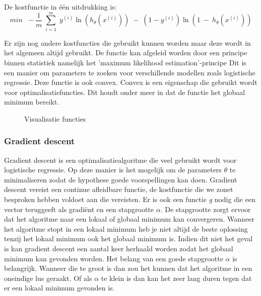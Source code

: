 De kostfunctie in één uitdrukking is: 
$$ 
min \;\; -\frac{1}{m}\;\sum_{i=1}^{m} \;  y^{(i)}\ln(h_{\theta}(x^{(i)})) \;- \;(1-y^{(i)}) \ln(1\:-\:h_{\theta}(x^{(i)}))  
$$

Er zijn nog andere kostfuncties die gebruikt kunnen worden maar deze wordt in het algemeen altijd gebruikt.
De functie kan afgeleid worden door een principe binnen statistiek namelijk het 'maximum likelihood estimation'-principe Dit is een manier om parameters te zoeken voor verschillende modellen zoals logistische regressie. Deze functie is ook convex. Convex is een eigenschap die gebruikt wordt voor optimalisatiefuncties. Dit houdt onder meer in dat de functie het globaal minimum bereikt. 

\begin{figure}
	\centering
	\caption{Visualisatie functies}
	\label{fig:kostfunctie}
\end{figure}

\subsubsection{Gradient descent}
\label{sec:gradient-descent}
Gradient descent is een optimalisatiealgoritme die veel gebruikt wordt voor logistische regressie. Op deze manier is het mogelijk om de parameters $\theta$ te minimaliseren zodat de hypothese goede voorspellingen kan doen.
Gradient descent vereist een continue afleidbare functie, de kostfunctie die we zonet besproken hebben voldoet aan die vereisten. Er is ook een functie \textit{g} nodig die een vector teruggeeft als gradiënt en een stapgrootte $\alpha$. De stapgrootte zorgt ervoor dat het algoritme naar een lokaal of globaal minimum kan convergeren. Wanneer het algoritme stopt in een lokaal minimum heb je niet altijd de beste oplossing tenzij het lokaal minimum ook het globaal minimum is. Indien dit niet het geval is kan gradient descent een aantal keer herhaald worden zodat het globaal minimum kan gevonden worden. Het belang van een goede stapgrootte $\alpha$ is belangrijk. Wanneer die te groot is dan zou het kunnen dat het algoritme in een oneindige lus geraakt. Of als $\alpha$ te klein is dan kan het zeer lang duren tegen dat er een lokaal minimum gevonden is. 

